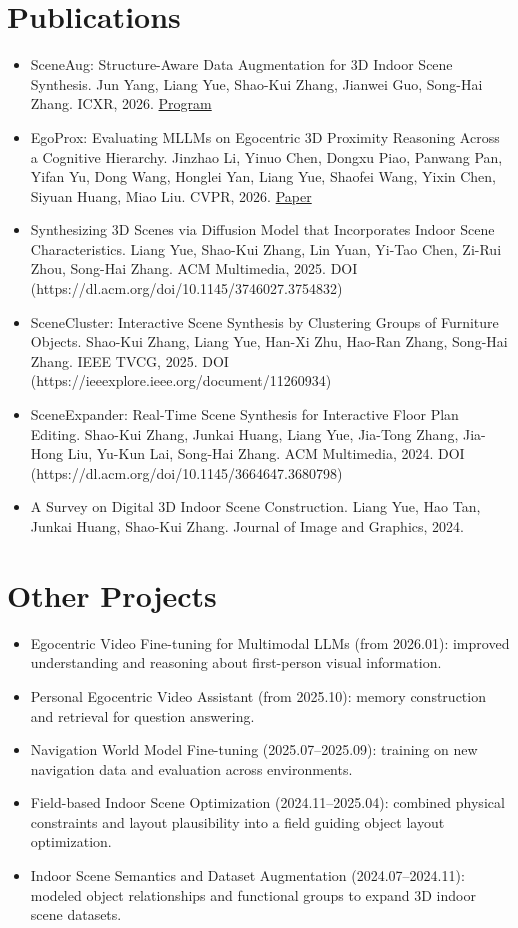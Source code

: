 \documentclass[a4paper,10pt]{article}
\begin{document}
\section*{Publications}
\par\smallskip
\begin{itemize}
\item SceneAug: Structure-Aware Data Augmentation for 3D Indoor Scene Synthesis. Jun Yang, Liang Yue, Shao-Kui Zhang, Jianwei Guo, Song-Hai Zhang. ICXR, 2026. \href{https://icxr.net/2026/ProgramPapers.html\#s2}{Program}
\item EgoProx: Evaluating MLLMs on Egocentric 3D Proximity Reasoning Across a Cognitive Hierarchy. Jinzhao Li, Yinuo Chen, Dongxu Piao, Panwang Pan, Yifan Yu, Dong Wang, Honglei Yan, Liang Yue, Shaofei Wang, Yixin Chen, Siyuan Huang, Miao Liu. CVPR, 2026. \href{https://arxiv.org/abs/2605.24456}{Paper}
\item Synthesizing 3D Scenes via Diffusion Model that Incorporates Indoor Scene Characteristics. Liang Yue, Shao-Kui Zhang, Lin Yuan, Yi-Tao Chen, Zi-Rui Zhou, Song-Hai Zhang. ACM Multimedia, 2025. DOI (https://dl.acm.org/doi/10.1145/3746027.3754832)
\item SceneCluster: Interactive Scene Synthesis by Clustering Groups of Furniture Objects. Shao-Kui Zhang, Liang Yue, Han-Xi Zhu, Hao-Ran Zhang, Song-Hai Zhang. IEEE TVCG, 2025. DOI (https://ieeexplore.ieee.org/document/11260934)
\item SceneExpander: Real-Time Scene Synthesis for Interactive Floor Plan Editing. Shao-Kui Zhang, Junkai Huang, Liang Yue, Jia-Tong Zhang, Jia-Hong Liu, Yu-Kun Lai, Song-Hai Zhang. ACM Multimedia, 2024. DOI (https://dl.acm.org/doi/10.1145/3664647.3680798)
\item A Survey on Digital 3D Indoor Scene Construction. Liang Yue, Hao Tan, Junkai Huang, Shao-Kui Zhang. Journal of Image and Graphics, 2024.
\end{itemize}
\par\smallskip
\section*{Other Projects}
\par\smallskip
\begin{itemize}
\item Egocentric Video Fine-tuning for Multimodal LLMs (from 2026.01): improved understanding and reasoning about first-person visual information.
\item Personal Egocentric Video Assistant (from 2025.10): memory construction and retrieval for question answering.
\item Navigation World Model Fine-tuning (2025.07–2025.09): training on new navigation data and evaluation across environments.
\item Field-based Indoor Scene Optimization (2024.11–2025.04): combined physical constraints and layout plausibility into a field guiding object layout optimization.
\item Indoor Scene Semantics and Dataset Augmentation (2024.07–2024.11): modeled object relationships and functional groups to expand 3D indoor scene datasets.
\end{itemize}
\par\smallskip
\end{document}
